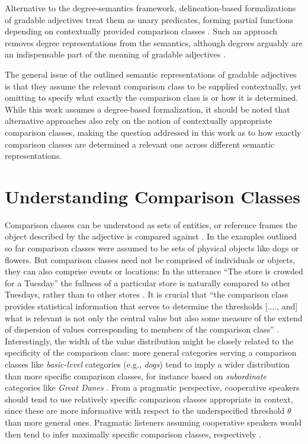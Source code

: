 Alternative to the degree-semantics framework, delineation-based formalizations of gradable adjectives treat them as unary predicates, forming partial functions depending on contextually provided comparison classes \parencite{Klein1980}. Such an approach removes degree representations from the semantics, although degrees arguably are an indispensable part of the meaning of gradable adjectives \parencite{Solt2009}. 

The general issue of the outlined semantic representations of gradable adjectives is that they assume the relevant comparison class to be supplied contextually, yet omitting to specify what exactly the comparison class is or how it is determined. 
While this work assumes a degree-based formalization, it should be noted that alternative approaches also rely on the notion of contextually appropriate comparison classes, making the question addressed in this work as to how exactly comparison classes are determined a relevant one across different semantic representations.

\section{Understanding Comparison Classes}
\label{2.2.}
Comparison classes can be understood as sets of entities, or reference frames the object described by the adjective is compared against \parencite{Bierwisch1989, Solt2009, Klein1980}. In the examples outlined so far comparison classes were assumed to be sets of physical objects like dogs or flowers. But comparison classes need not be comprised of individuals or objects, they can also comprise events or locations: In the utterance “The store is crowded for a Tuesday” the fullness of a particular store is naturally compared to other Tuesdays, rather than to other stores \parencite{Solt2009}. It is crucial that “the comparison class provides statistical information that serves to determine the thresholds [...., and] what is relevant is not only the central value but also some measure of the extend of dispersion of values corresponding to members of the comparison class” \parencite[p.193]{Solt2009}.  Interestingly, the width of the value distribution might be closely related to the specificity of the comparison class: more general categories serving a comparison classes like \textit{basic-level} categories (e.g., \emph{dogs}) tend to imply a wider distribution than more specific comparison classes, for instance based on \textit{subordinate} categories like \emph{Great Danes} \parencite{rosch1976}. From a pragmatic perspective, cooperative speakers should tend to use relatively specific comparison classes appropriate in context, since these are more informative with respect to the underspecified threshold $\theta$ than more general ones. Pragmatic listeners assuming cooperative speakers would then tend to infer maximally specific comparison classes, respectively \parencite{tessler2017warm}. 

